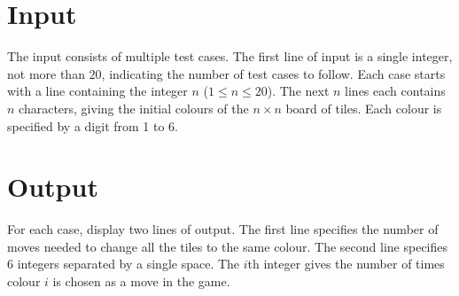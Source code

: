 \section*{Input}

The input consists of multiple test cases. The first line of input 
is a single integer, not more than $20$, indicating the number
of test cases to follow.  
Each case starts with
a line containing the integer $n$ ($1 \leq n \leq 20$).  The next $n$
lines each contains $n$ characters, giving the initial colours of the 
$n \times n$ board of tiles. Each colour is specified by a digit from
1 to 6.


\section*{Output}

For each case, display two lines of output.  The first line
specifies the number of moves needed to change all the tiles to the
same colour.  The second line specifies 6 integers separated by a
single space. The $i$th integer gives the number of times colour $i$
is chosen as a move in the game.

